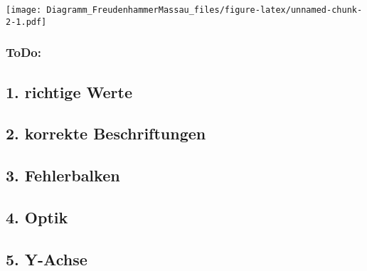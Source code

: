 \documentclass[]{article}
\newenvironment{Shaded}{\begin{snugshade}}{\end{snugshade}}
\newcommand{\DataTypeTok}[1]{\textcolor[rgb]{0.13,0.29,0.53}{#1}}
\newcommand{\KeywordTok}[1]{\textcolor[rgb]{0.13,0.29,0.53}{\textbf{#1}}}
\newcommand{\NormalTok}[1]{#1}
\newcommand{\OperatorTok}[1]{\textcolor[rgb]{0.81,0.36,0.00}{\textbf{#1}}}
\newcommand{\StringTok}[1]{\textcolor[rgb]{0.31,0.60,0.02}{#1}}
\begin{document}
\begin{Shaded}
\end{Shaded}

\texttt{[image: Diagramm\_FreudenhammerMassau\_files/figure-latex/unnamed-chunk-2-1.pdf]}

\hypertarget{todo}{%
\subsubsection{ToDo:}\label{todo}}

\hypertarget{richtige-werte}{%
\subsection{1. richtige Werte}\label{richtige-werte}}

\hypertarget{korrekte-beschriftungen}{%
\subsection{2. korrekte Beschriftungen}\label{korrekte-beschriftungen}}

\hypertarget{fehlerbalken}{%
\subsection{3. Fehlerbalken}\label{fehlerbalken}}

\hypertarget{optik}{%
\subsection{4. Optik}\label{optik}}

\hypertarget{y-achse}{%
\subsection{5. Y-Achse}\label{y-achse}}
\end{document}
